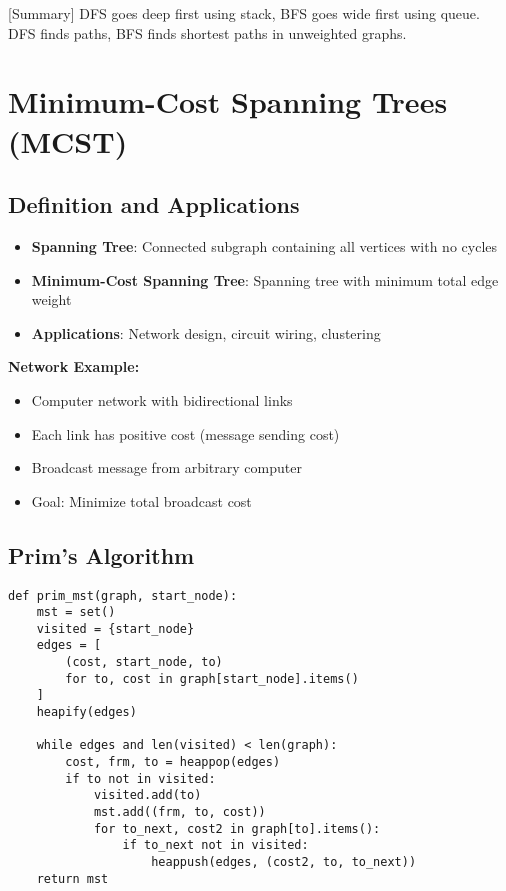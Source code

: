\documentclass[12pt]{article}
\begin{document}
[Summary] DFS goes deep first using stack, BFS goes wide first using queue. DFS finds paths, BFS finds shortest paths in unweighted graphs.

\section{Minimum-Cost Spanning Trees (MCST)}

\subsection{Definition and Applications}

\begin{itemize}
    \item \textbf{Spanning Tree}: Connected subgraph containing all vertices with no cycles
    \item \textbf{Minimum-Cost Spanning Tree}: Spanning tree with minimum total edge weight
    \item \textbf{Applications}: Network design, circuit wiring, clustering
\end{itemize}

\textbf{Network Example:}
\begin{itemize}
    \item Computer network with bidirectional links
    \item Each link has positive cost (message sending cost)
    \item Broadcast message from arbitrary computer
    \item Goal: Minimize total broadcast cost
\end{itemize}

\subsection{Prim's Algorithm}

\begin{verbatim}
def prim_mst(graph, start_node):
    mst = set()
    visited = {start_node}
    edges = [
        (cost, start_node, to)
        for to, cost in graph[start_node].items()
    ]
    heapify(edges)
    
    while edges and len(visited) < len(graph):
        cost, frm, to = heappop(edges)
        if to not in visited:
            visited.add(to)
            mst.add((frm, to, cost))
            for to_next, cost2 in graph[to].items():
                if to_next not in visited:
                    heappush(edges, (cost2, to, to_next))
    return mst
\end{verbatim}
\end{document}
